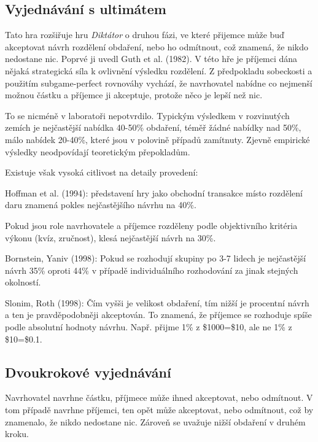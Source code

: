 \documentclass[a5paper,12pt]{article}
\begin{document}
    \subsection{Vyjednávání s ultimátem}
      Tato hra rozšiřuje hru \emph{Diktátor} o druhou fázi, ve které přijemce může buď akceptovat návrh rozdělení
      obdaření, nebo ho odmítnout, což znamená, že nikdo nedostane nic. Poprvé ji uvedl Guth et al. (1982).
      V této hře je příjemci dána nějaká strategická síla k ovlivnění výsledku rozdělení.
      Z předpokladu sobeckosti a použitím subgame-perfect rovnováhy vychází, že navrhovatel nabídne co nejmenší
      možnou částku a příjemce ji akceptuje, protože něco je lepší než nic.

      To se nicméně v laboratoři nepotvrdilo. Typickým výsledkem v rozvinutých zemích je nejčastější
      nabídka 40-50\% obdaření, téměř žádné nabídky nad 50\%, málo nabídek 20-40\%, které jsou v polovině
      případů zamítnuty. Zjevně empirické výsledky neodpovídají teoretickým přepokladům.

      Existuje však vysoká citlivost na detaily provedení:
      \begin{compactitem}
        \item 
          Hoffman et al. (1994): 
          představení hry jako obchodní transakce místo rozdělení daru znamená pokles nejčastějšího návrhu na 40\%.
        \item 
          Pokud jsou role navrhovatele a příjemce rozděleny podle objektivního kritéria výkonu (kvíz, zručnost), 
          klesá nejčastější návrh na 30\%.
        \item
          Bornstein, Yaniv (1998):
          Pokud se rozhodují skupiny po 3-7 lidech je nejčastější návrh 35\% oproti 44\% v případě individuálního
          rozhodování za jinak stejných okolností.
        \item
          Slonim, Roth (1998):
          Čím vyšši je velikost obdaření, tím nižší je procentní návrh a ten je pravděpodobněji akceptován.
          To znamená, že příjemce se rozhoduje spíše podle absolutní hodnoty návrhu. Např. přijme 1\% z \$1000=\$10,
          ale ne 1\% z \$10=\$0.1.

      \end{compactitem}
    \subsection{Dvoukrokové vyjednávání}
      Navrhovatel navrhne částku, příjmece může ihned akceptovat, nebo odmítnout. V tom případě navrhne příjemci,
      ten opět může akceptovat, nebo odmítnout, což by znamenalo, že nikdo nedostane nic.
      Zároveň se uvažuje nižší obdaření v druhém kroku.
\end{document}
